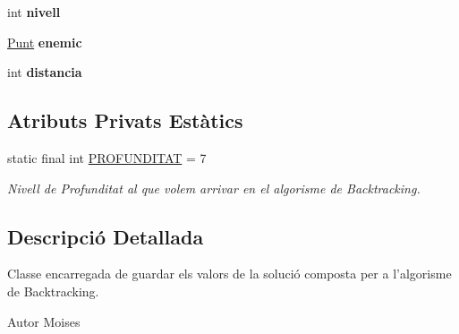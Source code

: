 \begin{DoxyCompactItemize}
\item 
\hypertarget{classlogica_1_1algoritmica_1_1_back_tracking_1_1_solucio_ab961383343361fb5a85ec93d8e227960}{int {\bfseries nivell}}\label{classlogica_1_1algoritmica_1_1_back_tracking_1_1_solucio_ab961383343361fb5a85ec93d8e227960}

\item 
\hypertarget{classlogica_1_1algoritmica_1_1_back_tracking_1_1_solucio_ad041f270ecc5624cf3cf11cc9687975c}{\hyperlink{classlogica_1_1_punt}{Punt} {\bfseries enemic}}\label{classlogica_1_1algoritmica_1_1_back_tracking_1_1_solucio_ad041f270ecc5624cf3cf11cc9687975c}

\item 
\hypertarget{classlogica_1_1algoritmica_1_1_back_tracking_1_1_solucio_a50c012f2ed6e23bd4292b398c8b5cb51}{int {\bfseries distancia}}\label{classlogica_1_1algoritmica_1_1_back_tracking_1_1_solucio_a50c012f2ed6e23bd4292b398c8b5cb51}

\end{DoxyCompactItemize}
\subsection*{Atributs Privats Estàtics}
\begin{DoxyCompactItemize}
\item 
\hypertarget{classlogica_1_1algoritmica_1_1_back_tracking_1_1_solucio_acde1b053bf1a568f0b8830a86b6cc095}{static final int \hyperlink{classlogica_1_1algoritmica_1_1_back_tracking_1_1_solucio_acde1b053bf1a568f0b8830a86b6cc095}{P\+R\+O\+F\+U\+N\+D\+I\+T\+A\+T} = 7}\label{classlogica_1_1algoritmica_1_1_back_tracking_1_1_solucio_acde1b053bf1a568f0b8830a86b6cc095}

\begin{DoxyCompactList}\small\item\em Nivell de Profunditat al que volem arrivar en el algorisme de Backtracking. \end{DoxyCompactList}\end{DoxyCompactItemize}


\subsection{Descripció Detallada}
Classe encarregada de guardar els valors de la solució composta per a l'algorisme de Backtracking. 

\begin{DoxyAuthor}{Autor}
Moises 
\end{DoxyAuthor}


